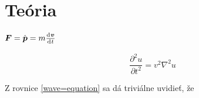 \section{Teória}

\lipsum[2] $\vec{F} = \dot{\vec{p}} = m\frac{\diff \vec{v}}{\diff t}$

\begin{equation} \label{wave=equation}
	\frac{\partial^2 u}{\partial t^2} = v^2 \nabla^2 u
\end{equation}

Z rovnice \ref{wave=equation} sa dá triviálne uvidieť, že \lipsum[3]
